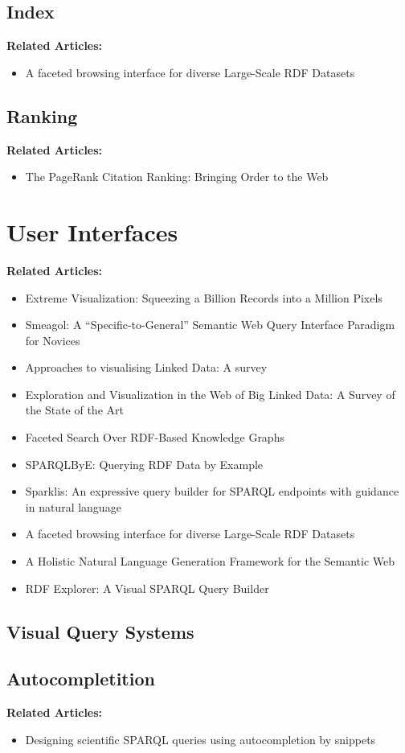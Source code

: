 \subsection{Index}
\label{chap:lucene}

\textbf{Related Articles:}
\begin{itemize}
    \item A faceted browsing interface for diverse Large-Scale RDF Datasets\cite{Moreno2018}
\end{itemize}

\subsection{Ranking}
\label{chap:pagerank}


\textbf{Related Articles:}
\begin{itemize}
    \item The PageRank Citation Ranking: Bringing Order to the Web\cite{Page1998}
\end{itemize}

\section{User Interfaces}

\textbf{Related Articles:}
\begin{itemize}
    \item Extreme Visualization: Squeezing a Billion Records into a Million Pixels \cite{Shneiderman2008}
    \item Smeagol: A “Specific-to-General” Semantic Web Query Interface Paradigm for Novices \cite{Clemmer2011}
    \item Approaches to visualising Linked Data: A survey \cite{Dadzie2011}
    \item Exploration and Visualization in the Web of Big Linked Data: A Survey of the State of the Art \cite{Bikakis2016}
    \item Faceted Search Over RDF-Based Knowledge Graphs \cite{Arenas2016}
    \item SPARQLByE: Querying RDF Data by Example \cite{Diaz2016}
    \item Sparklis: An expressive query builder for SPARQL endpoints with guidance in natural language \cite{Ferre2016}
    \item A faceted browsing interface for diverse Large-Scale RDF Datasets \cite{Moreno2018}
    \item A Holistic Natural Language Generation Framework for the Semantic Web \cite{Ngomo2019}
    \item RDF Explorer: A Visual SPARQL Query Builder \cite{Vargas2019}
\end{itemize}

\subsection{Visual Query Systems}

\subsection{Autocompletition}
\textbf{Related Articles:}
\begin{itemize}
    \item Designing scientific SPARQL queries using autocompletion by snippets\cite{Rafes2018}
\end{itemize}
